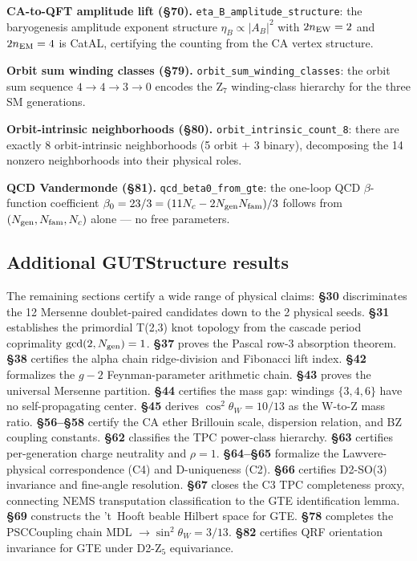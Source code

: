 \documentclass[11pt,a4paper]{article}
\theoremstyle{definition}
\begin{document}
\textbf{CA-to-QFT amplitude lift (§70).}
\lstinline|eta_B_amplitude_structure|: the baryogenesis amplitude exponent structure
$\eta_B \propto |A_B|^2$ with $2n_{\rm EW}=2$ and $2n_{\rm EM}=4$ is CatAL, certifying
the counting from the CA vertex structure.

\textbf{Orbit sum winding classes (§79).}
\lstinline|orbit_sum_winding_classes|: the orbit sum sequence $4\to 4\to 3\to 0$
encodes the Z$_7$ winding-class hierarchy for the three SM generations.

\textbf{Orbit-intrinsic neighborhoods (§80).}
\lstinline|orbit_intrinsic_count_8|: there are exactly 8 orbit-intrinsic neighborhoods
(5 orbit $+$ 3 binary), decomposing the 14 nonzero neighborhoods into their physical roles.

\textbf{QCD Vandermonde (§81).}
\lstinline|qcd_beta0_from_gte|: the one-loop QCD $\beta$-function coefficient
$\beta_0 = 23/3 = (11 N_c - 2 N_{\rm gen} N_{\rm fam})/3$ follows from $(N_{\rm gen},
N_{\rm fam}, N_c)$ alone — no free parameters.

\subsection{Additional GUTStructure results}\label{subsec:gut-additional}

The remaining sections certify a wide range of physical claims:
\textbf{§30} discriminates the 12 Mersenne doublet-paired candidates down to the 2
physical seeds.
\textbf{§31} establishes the primordial T(2,3) knot topology from the cascade period
coprimality $\gcd(2, N_{\rm gen}) = 1$.
\textbf{§37} proves the Pascal row-3 absorption theorem.
\textbf{§38} certifies the alpha chain ridge-division and Fibonacci lift index.
\textbf{§42} formalizes the $g-2$ Feynman-parameter arithmetic chain.
\textbf{§43} proves the universal Mersenne partition.
\textbf{§44} certifies the mass gap: windings $\{3,4,6\}$ have no self-propagating center.
\textbf{§45} derives $\cos^2\theta_W = 10/13$ as the W-to-Z mass ratio.
\textbf{§56--§58} certify the CA ether Brillouin scale, dispersion relation, and
BZ coupling constants.
\textbf{§62} classifies the TPC power-class hierarchy.
\textbf{§63} certifies per-generation charge neutrality and $\rho = 1$.
\textbf{§64--§65} formalize the Lawvere-physical correspondence (C4) and D-uniqueness (C2).
\textbf{§66} certifies D2-SO(3) invariance and fine-angle resolution.
\textbf{§67} closes the C3 TPC completeness proxy, connecting NEMS transputation classification
to the GTE identification lemma.
\textbf{§69} constructs the 't~Hooft beable Hilbert space for GTE.
\textbf{§78} completes the PSCCoupling chain MDL $\to\sin^2\theta_W = 3/13$.
\textbf{§82} certifies QRF orientation invariance for GTE under D2-Z$_5$ equivariance.
\end{document}
